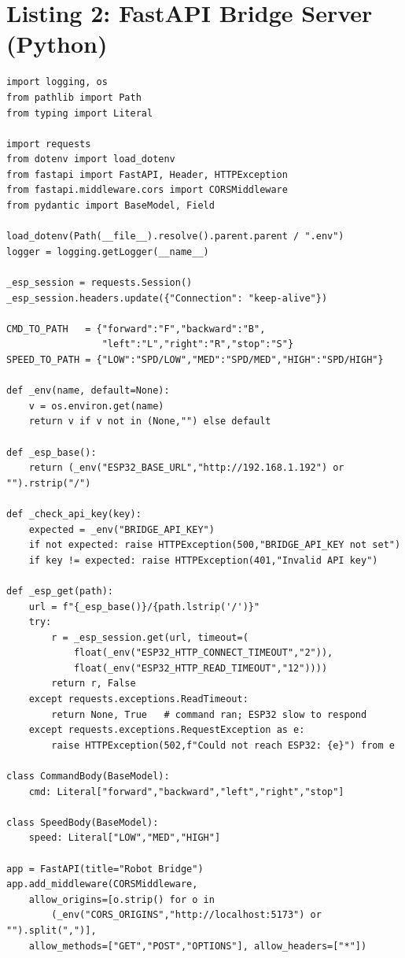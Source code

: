 \documentclass[12pt]{report}
\begin{document}
\section*{Listing 2: FastAPI Bridge Server (Python)}

\begin{lstlisting}[style=python,
caption={FastAPI bridge --- authenticates and forwards commands to the ESP32.}]
import logging, os
from pathlib import Path
from typing import Literal

import requests
from dotenv import load_dotenv
from fastapi import FastAPI, Header, HTTPException
from fastapi.middleware.cors import CORSMiddleware
from pydantic import BaseModel, Field

load_dotenv(Path(__file__).resolve().parent.parent / ".env")
logger = logging.getLogger(__name__)

_esp_session = requests.Session()
_esp_session.headers.update({"Connection": "keep-alive"})

CMD_TO_PATH   = {"forward":"F","backward":"B",
                 "left":"L","right":"R","stop":"S"}
SPEED_TO_PATH = {"LOW":"SPD/LOW","MED":"SPD/MED","HIGH":"SPD/HIGH"}

def _env(name, default=None):
    v = os.environ.get(name)
    return v if v not in (None,"") else default

def _esp_base():
    return (_env("ESP32_BASE_URL","http://192.168.1.192") or "").rstrip("/")

def _check_api_key(key):
    expected = _env("BRIDGE_API_KEY")
    if not expected: raise HTTPException(500,"BRIDGE_API_KEY not set")
    if key != expected: raise HTTPException(401,"Invalid API key")

def _esp_get(path):
    url = f"{_esp_base()}/{path.lstrip('/')}"
    try:
        r = _esp_session.get(url, timeout=(
            float(_env("ESP32_HTTP_CONNECT_TIMEOUT","2")),
            float(_env("ESP32_HTTP_READ_TIMEOUT","12"))))
        return r, False
    except requests.exceptions.ReadTimeout:
        return None, True   # command ran; ESP32 slow to respond
    except requests.exceptions.RequestException as e:
        raise HTTPException(502,f"Could not reach ESP32: {e}") from e

class CommandBody(BaseModel):
    cmd: Literal["forward","backward","left","right","stop"]

class SpeedBody(BaseModel):
    speed: Literal["LOW","MED","HIGH"]

app = FastAPI(title="Robot Bridge")
app.add_middleware(CORSMiddleware,
    allow_origins=[o.strip() for o in
        (_env("CORS_ORIGINS","http://localhost:5173") or "").split(",")],
    allow_methods=["GET","POST","OPTIONS"], allow_headers=["*"])


\end{lstlisting}
\end{document}
